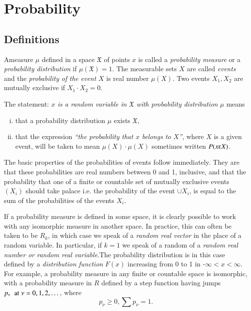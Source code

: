 \chapter{Probability}\label{chap2}

\section{Definitions}\label{chap2:sec1}

A\pageoriginale measure $\mu$ defined in a space $\mathfrak{X}$ of points $x$ is
called a \textit{probability 
measure} or a \textit{probability distribution} if $\mu (\mathfrak{X})
= 1$. The measurable sets $X$ are called \textit{events} and the
\textit{probability of the event} $X$
is real number $\mu(X)$. Two events $X_1,X_2$ are mutually exclusive
if $X_1\cdot X_2 =0$. 

The statement: \textit{$x$ is a random variable in $\mathfrak{X}$ with
  probability distribution} $\mu$ means 

\begin{enumerate}[(i)]
\item that a probability distribution $\mu$ exists $\mathfrak{X}$,
\item that the expression \textit{``the probability that $x$ belongs to
  $X$''}, where 
  $X$ is a given event, will be taken to mean $\mu (X)\cdot \mu(X)$ sometimes
  written $P(x \varepsilonup X)$. 
\end{enumerate}
 
The basic properties of the probabilities of events follow
immediately. They are that these probabilities are real numbers
between 0 and 1, inclusive, and that the probability that one of a
finite or countable set of mutually exclusive events $(X_i)$ should
take palace i.e. the probability of the event $\cup X_i$, is equal to the
sum of the probabilities of the events $X_i$. 

If a probability measure is defined in some space, it is clearly
possible to work with any isomorphic measure in another space. In
practice, this can often be taken to be $R_k$, in which case we speak
of a \textit{random real vector} in the place of a random variable. In
particular, if $k=1$ we speak of a random of a \textit{random real
  number or random 
real variable}.\pageoriginale The probability distribution is in this case defined by
a \textit{distribution function} $F(x)$ increasing from 0 to 1 in
-$\infty<x<\infty$. For example, a probability measure in any finite
or countable space is isomorphic, with a probability measure in $R$
defined by a step function having jumps $p_\nu \;{\rm \;at}\; \nu=0,
1, 2, \dots $, where 
$$
p_\nu \geq 0, \sum p_\nu = 1. 
$$

